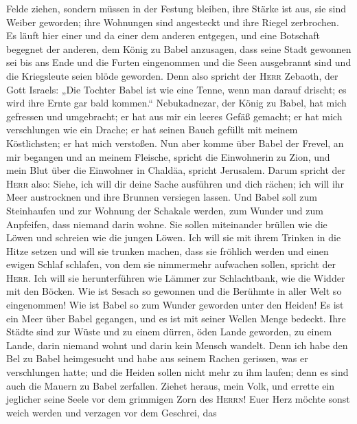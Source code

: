 Felde ziehen, sondern müssen in der Festung bleiben, ihre Stärke ist
aus, sie sind Weiber geworden; ihre Wohnungen sind angesteckt und ihre
Riegel zerbrochen.  Es läuft hier einer und da einer dem
anderen entgegen, und eine Botschaft begegnet der anderen, dem König zu
Babel anzusagen, dass seine Stadt gewonnen sei bis ans Ende
 und die Furten eingenommen und die Seen ausgebrannt sind
und die Kriegsleute seien blöde geworden.  Denn also
spricht der \textsc{Herr} Zebaoth, der Gott Israels: „Die Tochter Babel
ist wie eine Tenne, wenn man darauf drischt; es wird ihre Ernte gar bald
kommen.``  Nebukadnezar, der König zu Babel, hat mich
gefressen und umgebracht; er hat aus mir ein leeres Gefäß gemacht; er
hat mich verschlungen wie ein Drache; er hat seinen Bauch gefüllt mit
meinem Köstlichsten; er hat mich verstoßen.  Nun aber
komme über Babel der Frevel, an mir begangen und an meinem Fleische,
spricht die Einwohnerin zu Zion, und mein Blut über die Einwohner in
Chaldäa, spricht Jerusalem.  Darum spricht der
\textsc{Herr} also: Siehe, ich will dir deine Sache ausführen und dich
rächen; ich will ihr Meer austrocknen und ihre Brunnen versiegen lassen.
 Und Babel soll zum Steinhaufen und zur Wohnung der
Schakale werden, zum Wunder und zum Anpfeifen, dass niemand darin wohne.
 Sie sollen miteinander brüllen wie die Löwen und
schreien wie die jungen Löwen.  Ich will sie mit ihrem
Trinken in die Hitze setzen und will sie trunken machen, dass sie
fröhlich werden und einen ewigen Schlaf schlafen, von dem sie nimmermehr
aufwachen sollen, spricht der \textsc{Herr}.  Ich will
sie herunterführen wie Lämmer zur Schlachtbank, wie die Widder mit den
Böcken.  Wie ist Sesach so gewonnen und die Berühmte in
aller Welt so eingenommen! Wie ist Babel so zum Wunder geworden unter
den Heiden!  Es ist ein Meer über Babel gegangen, und es
ist mit seiner Wellen Menge bedeckt.  Ihre Städte sind
zur Wüste und zu einem dürren, öden Lande geworden, zu einem Lande,
darin niemand wohnt und darin kein Mensch wandelt.  Denn
ich habe den Bel zu Babel heimgesucht und habe aus seinem Rachen
gerissen, was er verschlungen hatte; und die Heiden sollen nicht mehr zu
ihm laufen; denn es sind auch die Mauern zu Babel zerfallen.
 Ziehet heraus, mein Volk, und errette ein jeglicher
seine Seele vor dem grimmigen Zorn des \textsc{Herrn}! 
Euer Herz möchte sonst weich werden und verzagen vor dem Geschrei, das
